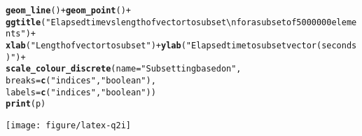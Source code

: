 \documentclass{article}\usepackage[]{graphicx}\usepackage[]{color}
\makeatletter
\def\maxwidth{ %
  \ifdim\Gin@nat@width>\linewidth
    \linewidth
  \else
    \Gin@nat@width
  \fi
}
\newcommand{\hlstr}[1]{\textcolor[rgb]{0.192,0.494,0.8}{#1}}%
\newcommand{\hlopt}[1]{\textcolor[rgb]{0,0,0}{#1}}%
\newcommand{\hlstd}[1]{\textcolor[rgb]{0.345,0.345,0.345}{#1}}%
\newcommand{\hlkwc}[1]{\textcolor[rgb]{0.333,0.667,0.333}{#1}}%
\newcommand{\hlkwd}[1]{\textcolor[rgb]{0.737,0.353,0.396}{\textbf{#1}}}%
\newenvironment{kframe}{%
 \def\at@end@of@kframe{}%
 \ifinner\ifhmode%
  \def\at@end@of@kframe{\end{minipage}}%
  \begin{minipage}{\columnwidth}%
 \fi\fi%
 \def\FrameCommand##1{\hskip\@totalleftmargin \hskip-\fboxsep
 \colorbox{shadecolor}{##1}\hskip-\fboxsep
     \hskip-\linewidth \hskip-\@totalleftmargin \hskip\columnwidth}%
 \MakeFramed {\advance\hsize-\width
   \@totalleftmargin\z@ \linewidth\hsize
   \@setminipage}}%
 {\par\unskip\endMakeFramed%
 \at@end@of@kframe}
\newenvironment{knitrout}{}{} %
\makeatother
\begin{document}
\begin{knitrout}
\begin{kframe}
\begin{alltt}
   \hlkwd{geom_line}\hlstd{()} \hlopt{+} \hlkwd{geom_point}\hlstd{()} \hlopt{+}
   \hlkwd{ggtitle}\hlstd{(}\hlstr{"Elapsed time vs length of vector to subset\textbackslash{}nfor a subset of 5000000 elements"}\hlstd{)} \hlopt{+}
   \hlkwd{xlab}\hlstd{(}\hlstr{"Length of vector to subset"}\hlstd{)} \hlopt{+} \hlkwd{ylab}\hlstd{(}\hlstr{"Elapsed time to subset vector (seconds)"}\hlstd{)} \hlopt{+}
   \hlkwd{scale_colour_discrete}\hlstd{(}\hlkwc{name} \hlstd{=} \hlstr{"Subsetting based on"}\hlstd{,}
                         \hlkwc{breaks} \hlstd{=} \hlkwd{c}\hlstd{(}\hlstr{"indices"}\hlstd{,} \hlstr{"boolean"}\hlstd{),}
                         \hlkwc{labels} \hlstd{=} \hlkwd{c}\hlstd{(}\hlstr{"indices"}\hlstd{,} \hlstr{"boolean"}\hlstd{))}
 \hlkwd{print}\hlstd{(p)}
\end{alltt}
\end{kframe}
\texttt{[image: figure/latex-q2i]} 

\end{knitrout}
\end{document}
